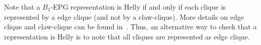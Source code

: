\documentclass[runningheads]{llncs}
\begin{document}










Note that a $B_1$-EPG representation is Helly if and only if each clique is represented by a edge clique (and not by a claw-clique). More details on edge clique and claw-clique can be found in~\cite{golumbic2009}. Thus, an alternative way to check that a representation is Helly is to note that all cliques are represented as edge clique. 

\smallskip
\end{document}
